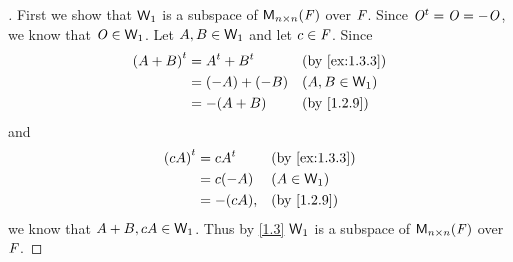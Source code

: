 \begin{proof}[]
	First we show that \(\mathsf{W}_1\) is a subspace of \(\mathsf{M}_{{n} \times n}({\mathit{F}})\) over \(\mathit{F}\).
	Since \({\mathit{O}}^{t} = \mathit{O} = -\mathit{O}\), we know that \(\mathit{O} \in \mathsf{W}_1\).
	Let \(A, B \in \mathsf{W}_1\) and let \(c \in \mathit{F}\).
	Since
	\begin{align*}
		\tp{(A + B)} & = \tp{A} + \tp{B} &  & \by{ex:1.3.3}   \\
		             & = (-A) + (-B)     &  & (A, B \in \W_1) \\
		             & = -(A + B)        &  & \by{1.2.9}
	\end{align*}
	and
	\begin{align*}
		\tp{(cA)} & = c \tp{A} &  & \by{ex:1.3.3} \\
		          & = c (-A)   &  & (A \in \W_1)  \\
		          & = -(cA),   &  & \by{1.2.9}
	\end{align*}
	we know that \(A + B, cA \in \mathsf{W}_1\).
	Thus by \cref{1.3} \(\mathsf{W}_1\) is a subspace of \(\mathsf{M}_{{n} \times n}({\mathit{F}})\) over \(\mathit{F}\).


\end{proof}
